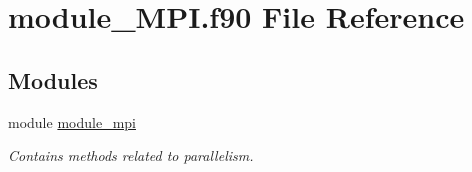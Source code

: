 \hypertarget{module___m_p_i_8f90}{}\section{module\+\_\+\+M\+P\+I.\+f90 File Reference}
\label{module___m_p_i_8f90}
\subsection*{Modules}
\begin{DoxyCompactItemize}
\item 
module \hyperlink{namespacemodule__mpi}{module\+\_\+mpi}
\begin{DoxyCompactList}\small\item\em Contains methods related to parallelism. \end{DoxyCompactList}\end{DoxyCompactItemize}
